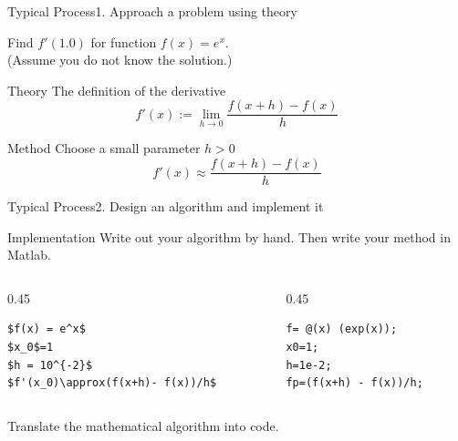 \documentclass[10pt]{beamer}
\begin{document}
\begin{frame}{Typical Process}{1. Approach a problem using theory}
\begin{example}
  Find $f'(1.0)$ for function $f(x)=e^{x}$.\\
  (Assume you do not know the solution.)
\end{example}
\begin{block}{Theory}
The definition of the derivative
  \begin{equation*} 
    f'(x) := \lim_{h\rightarrow 0} \frac{f(x+h) - f(x)}{h}
    \end{equation*}
\end{block}
\begin{block}{Method}
Choose a small parameter $h>0$
  \begin{equation*} 
    f'(x) \approx \frac{f(x+h) - f(x)}{h}
\end{equation*}
\end{block}
\end{frame}
\begin{frame}[fragile]{Typical Process}{2. Design an algorithm and implement it}
\begin{block}{Implementation}
    Write out your algorithm by hand. Then write your method in Matlab.
\end{block}
\begin{columns}
\begin{column}{0.45\textwidth}
\begin{lstlisting}[mathescape,caption=Algorithm (by hand)]
$f(x) = e^x$
$x_0$=1  
$h = 10^{-2}$
$f'(x_0)\approx(f(x+h)- f(x))/h$ 
\end{lstlisting}
\end{column}

\begin{column}{0.45\textwidth}
\begin{lstlisting}[caption= Implementation (Matlab)]
f= @(x) (exp(x));
x0=1;
h=1e-2;
fp=(f(x+h) - f(x))/h;
\end{lstlisting}
\end{column}
\end{columns}

\vspace{3mm}
\begin{center}
    Translate the mathematical algorithm into code.
\end{center}
\end{frame}
\end{document}
